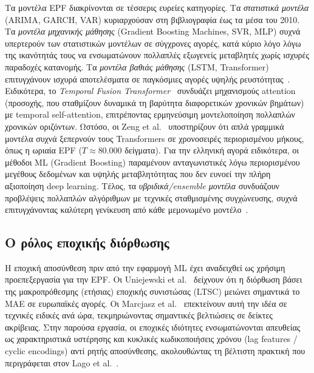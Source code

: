 Τα μοντέλα EPF διακρίνονται σε τέσσερις ευρείες κατηγορίες.
Τα \emph{στατιστικά μοντέλα} (ARIMA, GARCH, VAR) κυριαρχούσαν
στη βιβλιογραφία έως τα μέσα του 2010.
Τα \emph{μοντέλα μηχανικής μάθησης} (Gradient Boosting Machines, SVR, MLP)
συχνά υπερτερούν των στατιστικών μοντέλων σε σύγχρονες αγορές,
κατά κύριο λόγο λόγω της ικανότητάς τους να ενσωματώνουν
πολλαπλές εξωγενείς μεταβλητές χωρίς ισχυρές παραδοχές κατανομής.
Τα \emph{μοντέλα βαθιάς μάθησης} (LSTM, Transformer)
επιτυγχάνουν ισχυρά αποτελέσματα σε παγκόσμιες αγορές υψηλής
ρευστότητας~\cite{lago2018,marcjasz2023beating,lim2021temporal}. Ειδικότερα, το
\textit{Temporal Fusion Transformer}~\cite{lim2021temporal}
συνδυάζει μηχανισμούς attention (προσοχής, που σταθμίζουν δυναμικά τη βαρύτητα διαφορετικών χρονικών βημάτων) με temporal self-attention, επιτρέποντας
ερμηνεύσιμη μοντελοποίηση πολλαπλών χρονικών οριζόντων.
Ωστόσο, οι Zeng et al.~\cite{zeng2023transformers} υποστηρίζουν ότι απλά
γραμμικά μοντέλα συχνά ξεπερνούν τους Transformers σε χρονοσειρές
περιορισμένου μήκους, όπως η ωριαία EPF ($T \approx 80.000$ δείγματα).
Για την ελληνική αγορά ειδικότερα, οι μέθοδοι ML (Gradient Boosting)
παραμένουν ανταγωνιστικές λόγω περιορισμένου μεγέθους δεδομένων
και υψηλής μεταβλητότητας που δεν ευνοεί την πλήρη αξιοποίηση deep learning.
Τέλος, τα \emph{υβριδικά/ensemble μοντέλα} συνδυάζουν προβλέψεις
πολλαπλών αλγόριθμων με τεχνικές σταθμισμένης συγχώνευσης,
συχνά επιτυγχάνοντας καλύτερη γενίκευση από κάθε μεμονωμένο μοντέλο~\cite{dietterich2000,nowotarski2014}.

\subsection{Ο ρόλος εποχικής διόρθωσης}

Η εποχική αποσύνθεση πριν από την εφαρμογή ML έχει αναδειχθεί ως χρήσιμη
προεπεξεργασία για την EPF.
Οι Uniejewski et al.~\cite{uniejewski2019} δείχνουν ότι η διόρθωση
βάσει της μακροπρόθεσμης (ετήσιας) εποχικής συνιστώσας (LTSC)
μειώνει σημαντικά το MAE σε ευρωπαϊκές αγορές. Οι Marcjasz et
al.~\cite{marcjasz2019eneco} επεκτείνουν αυτή την ιδέα σε
τεχνικές ειδικές ανά ώρα, τεκμηριώνοντας σημαντικές βελτιώσεις
σε δείκτες ακρίβειας. Στην παρούσα εργασία, οι εποχικές
ιδιότητες ενσωματώνονται απευθείας ως χαρακτηριστικά υστέρησης και κυκλικές κωδικοποιήσεις χρόνου (lag features / cyclic encodings) αντί ρητής αποσύνθεσης, ακολουθώντας
τη βέλτιστη πρακτική που περιγράφεται στον Lago et al.~\cite{lago2021}.


